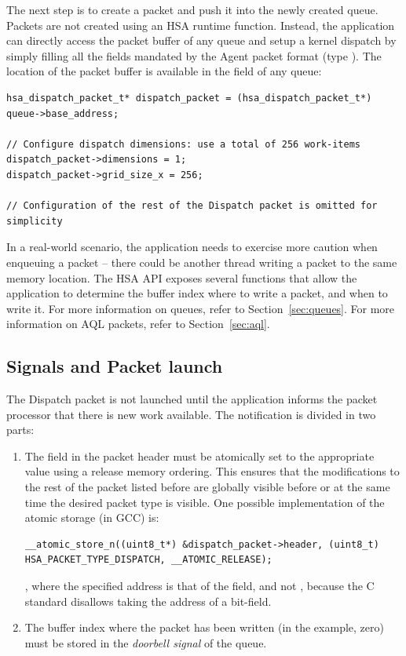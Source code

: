 \documentclass[final,oneside]{book}
\begin{document}
The next step is to create a packet and push it into the newly created
queue. Packets are not created using an HSA runtime function. Instead, the
application can directly access the packet buffer of any queue and setup a
kernel dispatch by simply filling all the fields mandated by the Agent packet
format (type ). The location of the packet buffer
is available in the  field of any queue:
\begin{lstlisting}
hsa_dispatch_packet_t* dispatch_packet = (hsa_dispatch_packet_t*) queue->base_address;

// Configure dispatch dimensions: use a total of 256 work-items
dispatch_packet->dimensions = 1;
dispatch_packet->grid_size_x = 256;

// Configuration of the rest of the Dispatch packet is omitted for simplicity
\end{lstlisting}

In a real-world scenario, the application needs to exercise more caution when
enqueuing a packet -- there could be another thread writing a packet to the same
memory location. The HSA API exposes several functions that allow the
application to determine the buffer index where to write a packet, and when to
write it. For more information on queues, refer to Section~\ref{sec:queues}. For
more information on AQL packets, refer to Section~\ref{sec:aql}.

\subsection{Signals and Packet launch}
The Dispatch packet is not launched until the application informs the packet
processor that there is new work available. The notification is divided in two
parts:

\begin{enumerate}
\item The  field in the packet header must be
  atomically set to the appropriate value using a release memory ordering. This
  ensures that the modifications to the rest of the packet listed before are
  globally visible before or at the same time the desired packet type is
  visible. One possible implementation of the atomic storage (in GCC) is:
\begin{lstlisting}
__atomic_store_n((uint8_t*) &dispatch_packet->header, (uint8_t) HSA_PACKET_TYPE_DISPATCH, __ATOMIC_RELEASE);
\end{lstlisting}
, where the specified address is that of the
 field, and not
, because the C standard disallows taking the
address of a bit-field.
\item The buffer index where the packet has been written (in the example, zero)
must be stored in the \textit{doorbell signal} of the queue.
\end{enumerate}
\end{document}
